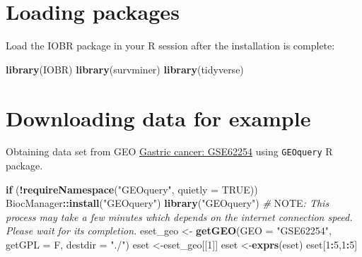 \documentclass[
  12pt,
]{book}
\newenvironment{Shaded}{\begin{snugshade}}{\end{snugshade}}
\newcommand{\AlertTok}[1]{\textcolor[rgb]{0.94,0.16,0.16}{#1}}
\newcommand{\AttributeTok}[1]{\textcolor[rgb]{0.13,0.29,0.53}{#1}}
\newcommand{\CommentTok}[1]{\textcolor[rgb]{0.56,0.35,0.01}{\textit{#1}}}
\newcommand{\ConstantTok}[1]{\textcolor[rgb]{0.56,0.35,0.01}{#1}}
\newcommand{\ControlFlowTok}[1]{\textcolor[rgb]{0.13,0.29,0.53}{\textbf{#1}}}
\newcommand{\DecValTok}[1]{\textcolor[rgb]{0.00,0.00,0.81}{#1}}
\newcommand{\FunctionTok}[1]{\textcolor[rgb]{0.13,0.29,0.53}{\textbf{#1}}}
\newcommand{\NormalTok}[1]{#1}
\newcommand{\OtherTok}[1]{\textcolor[rgb]{0.56,0.35,0.01}{#1}}
\newcommand{\SpecialCharTok}[1]{\textcolor[rgb]{0.81,0.36,0.00}{\textbf{#1}}}
\newcommand{\StringTok}[1]{\textcolor[rgb]{0.31,0.60,0.02}{#1}}
\theoremstyle{definition}
\theoremstyle{definition}
\theoremstyle{definition}
\theoremstyle{definition}
\theoremstyle{remark}
\begin{document}
\hypertarget{loading-packages-1}{%
\section{Loading packages}\label{loading-packages-1}}

Load the IOBR package in your R session after the installation is complete:

\begin{Shaded}
\begin{Highlighting}[]
\FunctionTok{library}\NormalTok{(IOBR)}
\FunctionTok{library}\NormalTok{(survminer)}
\FunctionTok{library}\NormalTok{(tidyverse)}
\end{Highlighting}
\end{Shaded}

\hypertarget{downloading-data-for-example-1}{%
\section{Downloading data for example}\label{downloading-data-for-example-1}}

Obtaining data set from GEO \href{https://pubmed.ncbi.nlm.nih.gov/25894828/}{Gastric cancer: GSE62254} using \texttt{GEOquery} R package.

\begin{Shaded}
\begin{Highlighting}[]
\ControlFlowTok{if}\NormalTok{ (}\SpecialCharTok{!}\FunctionTok{requireNamespace}\NormalTok{(}\StringTok{"GEOquery"}\NormalTok{, }\AttributeTok{quietly =} \ConstantTok{TRUE}\NormalTok{))  BiocManager}\SpecialCharTok{::}\FunctionTok{install}\NormalTok{(}\StringTok{"GEOquery"}\NormalTok{)}
\FunctionTok{library}\NormalTok{(}\StringTok{"GEOquery"}\NormalTok{)}
\CommentTok{\# }\AlertTok{NOTE}\CommentTok{: This process may take a few minutes which depends on the internet connection speed. Please wait for its completion.}
\NormalTok{eset\_geo }\OtherTok{\textless{}{-}} \FunctionTok{getGEO}\NormalTok{(}\AttributeTok{GEO =} \StringTok{"GSE62254"}\NormalTok{, }\AttributeTok{getGPL  =}\NormalTok{ F, }\AttributeTok{destdir =} \StringTok{"./"}\NormalTok{)}
\NormalTok{eset    }\OtherTok{\textless{}{-}}\NormalTok{eset\_geo[[}\DecValTok{1}\NormalTok{]]}
\NormalTok{eset    }\OtherTok{\textless{}{-}}\FunctionTok{exprs}\NormalTok{(eset)}
\NormalTok{eset[}\DecValTok{1}\SpecialCharTok{:}\DecValTok{5}\NormalTok{,}\DecValTok{1}\SpecialCharTok{:}\DecValTok{5}\NormalTok{]}
\end{Highlighting}
\end{Shaded}
\end{document}
